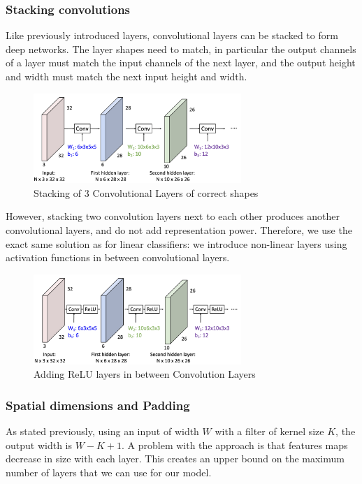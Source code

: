 \subsubsection{Stacking convolutions}
Like previously introduced layers, convolutional layers can be stacked to form deep networks. The layer shapes need to match, in particular the output channels of a layer must match the input channels of the next layer, and the output height and width must match the next input height and width.
\begin{figure}[H]
    \centering
    \includegraphics[width=0.7\textwidth]{images/stacking-conv-layers.png}
    \caption{Stacking of 3 Convolutional Layers of correct shapes}
\end{figure}

However, stacking two convolution layers next to each other produces another convolutional layers, and do not add representation power. Therefore, we use the exact same solution as for linear classifiers: we introduce non-linear layers using activation functions in between convolutional layers.
\begin{figure}[H]
    \centering
    \includegraphics[width=0.7\textwidth]{images/stacking-conv-relu.png}
    \caption{Adding ReLU layers in between Convolution Layers}
\end{figure}

\subsubsection{Spatial dimensions and Padding}
As stated previously, using an input of width $W$ with a filter of kernel size $K$, the output width is $W-K+1$. A problem with the approach is that features maps decrease in size with each layer. This creates an upper bound on the maximum number of layers that we can use for our model. 

